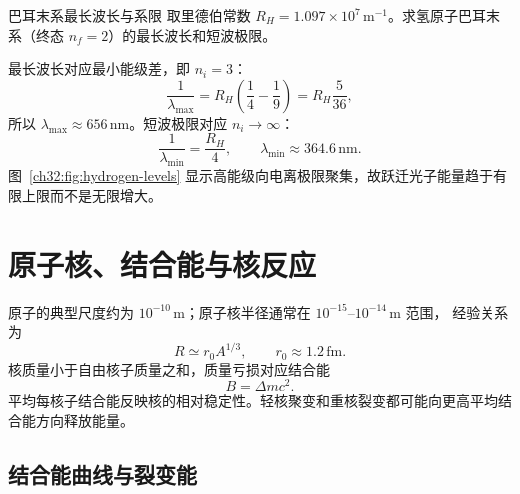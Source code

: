 \begin{origexamplebox}{巴耳末系最长波长与系限}
取里德伯常数 $R_H=1.097\times10^7\,\mathrm{m^{-1}}$。求氢原子巴耳末系（终态 $n_f=2$）的最长波长和短波极限。
\end{origexamplebox}
\begin{xesolution}

\begin{center}

\label{ch32:fig:hydrogen-levels}
\end{center}


最长波长对应最小能级差，即 $n_i=3$：
\[
 \frac1{\lambda_{\max}}=R_H\left(\frac14-\frac19\right)
 =R_H\frac5{36},
\]
所以 $\boxed{\lambda_{\max}\approx656\,\mathrm{nm}}$。短波极限对应 $n_i\to\infty$：
\[
 \frac1{\lambda_{\min}}=\frac{R_H}{4},
 \qquad \boxed{\lambda_{\min}\approx364.6\,\mathrm{nm}}.
\]
图~\ref{ch32:fig:hydrogen-levels} 显示高能级向电离极限聚集，故跃迁光子能量趋于有限上限而不是无限增大。
\end{xesolution}



\section{原子核、结合能与核反应}

原子的典型尺度约为 $10^{-10}\,\mathrm m$；原子核半径通常在 $10^{-15}$--$10^{-14}\,\mathrm m$ 范围，
经验关系为
\begin{equation}
 R\simeq r_0A^{1/3},\qquad r_0\approx1.2\,\mathrm{fm}.
\end{equation}
核质量小于自由核子质量之和，质量亏损对应结合能
\begin{equation}
 B=\Delta mc^2.
\end{equation}
平均每核子结合能反映核的相对稳定性。轻核聚变和重核裂变都可能向更高平均结合能方向释放能量。



\subsection{结合能曲线与裂变能}

